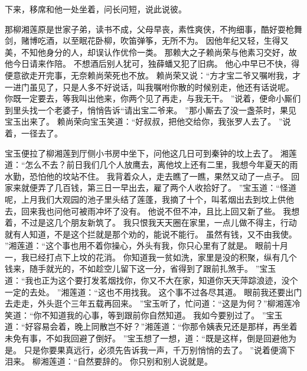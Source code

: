 下来，移席和他一处坐着，问长问短，说此说彼。
\par
那柳湘莲原是世家子弟，读书不成，父母早丧，素性爽侠，不拘细事，酷好耍枪舞剑，赌博吃酒，以至眠花卧柳，吹笛弹筝，无所不为。
因他年纪又轻，生得又美，不知他身分的人，却误认作优伶一类。
那赖大之子赖尚荣与他素习交好，故他今日请来作陪。
不想酒后别人犹可，独薛蟠又犯了旧病。
他心中早已不快，得便意欲走开完事，无奈赖尚荣死也不放。
赖尚荣又说：“方才宝二爷又嘱咐我，才一进门虽见了，只是人多不好说话，叫我嘱咐你散的时候别走，他还有话说呢。
你既一定要去，等我叫出他来，你两个见了再走，与我无干。
”说着，便命小厮们到里头找一个老婆子，悄悄告诉“请出宝二爷来。
”那小厮去了没一盏茶时，果见宝玉出来了。
赖尚荣向宝玉笑道：“好叔叔，把他交给你，我张罗人去了。
”说着，一径去了。
\par
宝玉便拉了柳湘莲到厅侧小书房中坐下，问他这几日可到秦钟的坟上去了。
湘莲道：“怎么不去？前日我们几个人放鹰去，离他坟上还有二里，我想今年夏天的雨水勤，恐怕他的坟站不住。
我背着众人，走去瞧了一瞧，果然又动了一点子。
回家来就便弄了几百钱，第三日一早出去，雇了两个人收拾好了。
”宝玉道：“怪道呢，上月我们大观园的池子里头结了莲蓬，我摘了十个，叫茗烟出去到坟上供他去，回来我也问他可被雨冲坏了没有。
他说不但不冲，且比上回又新了些。
我想着，不过是这几个朋友新筑了。
我只恨我天天圈在家里，一点儿做不得主，行动就有人知道，不是这个拦就是那个劝的，能说不能行。
虽然有钱，又不由我使。
”湘莲道：“这个事也用不着你操心，外头有我，你只心里有了就是。
眼前十月一，我已经打点下上坟的花消。
你知道我一贫如洗，家里是没的积聚，纵有几个钱来，随手就光的，不如趁空儿留下这一分，省得到了跟前扎煞手。
”宝玉道：“我也正为这个要打发茗烟找你，你又不大在家，知道你天天萍踪浪迹，没个一定的去处。
”湘莲道：“这也不用找我。
这个事不过各尽其道。
眼前我还要出门去走走，外头逛个三年五载再回来。
”宝玉听了，忙问道：“这是为何？”柳湘莲冷笑道：“你不知道我的心事，等到跟前你自然知道。
我如今要别过了。
”宝玉道：“好容易会着，晚上同散岂不好？”湘莲道：“你那令姨表兄还是那样，再坐着未免有事，不如我回避了倒好。
”宝玉想了一想，道：“既是这样，倒是回避他为是。
只是你要果真远行，必须先告诉我一声，千万别悄悄的去了。
”说着便滴下泪来。
柳湘莲道：“自然要辞的。
你只别和别人说就是。
